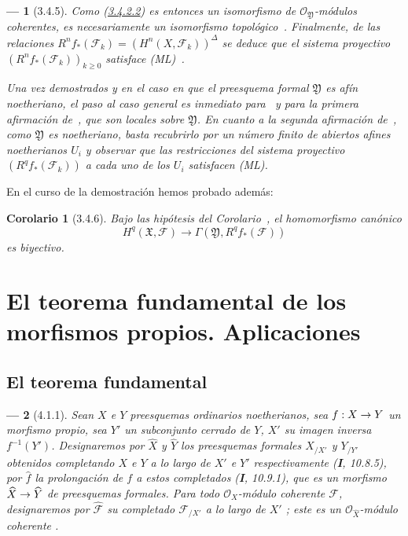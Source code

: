 \documentclass[10pt,oneside,openany]{book}
\theoremstyle{egaenv}\newtheorem*{env}{---}
\theoremstyle{egastatement}
\newtheorem*{corollary}{Corolario}
\theoremstyle{egadescription}
\newcommand{\oldpage}[2][]{\marginnote{\normalfont\scriptsize\textbf{#1}\,|\,#2}\ignorespaces}
\renewcommand{\geq}{\geqslant}
\renewcommand{\to}{\mathchoice{\longrightarrow}{\rightarrow}{\rightarrow}{\rightarrow}}
\begin{document}
\begin{env}[3.4.5]
Como (\hyperref[III.3.4.2.2]{3.4.2.2}) es entonces un isomorfismo de $\mathcal O_{\mathfrak Y}$-módulos coherentes, es necesariamente un isomorfismo \emph{topológico}~.
Finalmente, de las relaciones $R^nf_*(\mathcal F_k)=(H^n(X,\mathcal F_k))^\Delta$ se deduce que el sistema proyectivo $(R^nf_*(\mathcal F_k))_{k\geq0}$ satisface (ML)~.

Una vez demostrados  y  en el caso en que el preesquema formal $\mathfrak Y$ es afín noetheriano, el paso al caso general es inmediato para~ y para la primera afirmación de~, que son locales sobre $\mathfrak Y$.
En cuanto a la segunda afirmación de~, como $\mathfrak Y$ es noetheriano, basta recubrirlo por un número finito de abiertos afines noetherianos $U_i$ y observar que las restricciones del sistema proyectivo $(R^qf_*(\mathcal F_k))$ a cada uno de los $U_i$ satisfacen (ML).
\end{env}

En el curso de la demostración hemos probado además:
\begin{corollary}[3.4.6]
\label{III.3.4.6}
\label{III.3.4.6-fr}
Bajo las hipótesis del Corolario~, el homomorfismo canónico
\[
H^q(\mathfrak X,\mathcal F)
\longrightarrow\Gamma(\mathfrak Y,R^qf_*(\mathcal F))
\tag{3.4.6.1}\label{III.3.4.6.1-fr}
\]
es biyectivo.
\end{corollary}



\section{El teorema fundamental de los morfismos propios. Aplicaciones}
\label{section:III.4}
\label{section:III.4-fr}


\subsection{El teorema fundamental}
\label{subsection:III.4.1}
\label{subsection:III.4.1-fr}

\begin{env}[4.1.1]
\label{III.4.1.1}
\label{III.4.1.1-fr}
Sean $X$ e $Y$ preesquemas ordinarios noetherianos, sea $f:X\to Y$ un
morfismo \emph{propio}, sea $Y'$ un subconjunto cerrado de $Y$, $X'$ su imagen inversa
$f^{-1}(Y')$. Designaremos por $\widehat X$ y $\widehat Y$ los preesquemas formales
$X_{/X'}$ y $Y_{/Y'}$ \emph{obtenidos completando} $X$ e $Y$ a lo largo de
$X'$ e $Y'$ respectivamente (\textbf{I}, 10.8.5), por $\widehat f$ la \emph{prolongación}
de $f$ a estos completados (\textbf{I}, 10.9.1), que es un morfismo
$\widehat X\to\widehat Y$ de preesquemas formales. Para todo
$\mathcal O_X$-módulo \emph{coherente} $\mathcal F$,
\oldpage[III]{123}
designaremos por $\widehat{\mathcal F}$ su \emph{completado} $\mathcal F_{/X'}$ a lo
largo de $X'$ ; este es un
$\mathcal O_{\widehat X}$-módulo coherente .
\end{env}
\end{document}
